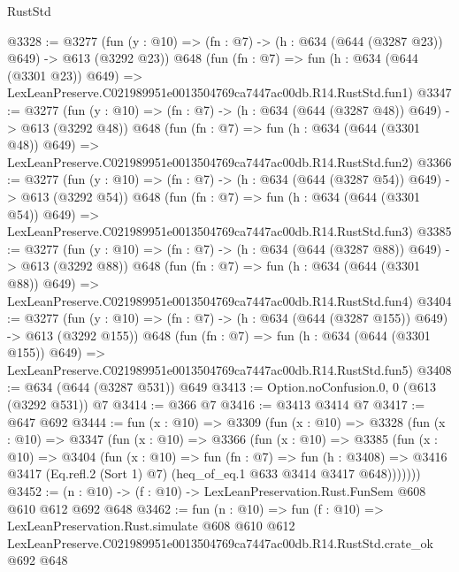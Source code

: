 \begin{lexlean}{RustStd}
\begin{coremodule}
@3328 := @3277
    (fun (y : @10) => (fn : @7) -> (h : @634 (@644 (@3287 @23)) @649) -> @613 (@3292 @23))
    @648
    (fun (fn : @7) =>
    fun (h : @634 (@644 (@3301 @23)) @649) =>
    LexLeanPreserve.C021989951e0013504769ca7447ac00db.R14.RustStd.fun1)
@3347 := @3277
    (fun (y : @10) => (fn : @7) -> (h : @634 (@644 (@3287 @48)) @649) -> @613 (@3292 @48))
    @648
    (fun (fn : @7) =>
    fun (h : @634 (@644 (@3301 @48)) @649) =>
    LexLeanPreserve.C021989951e0013504769ca7447ac00db.R14.RustStd.fun2)
@3366 := @3277
    (fun (y : @10) => (fn : @7) -> (h : @634 (@644 (@3287 @54)) @649) -> @613 (@3292 @54))
    @648
    (fun (fn : @7) =>
    fun (h : @634 (@644 (@3301 @54)) @649) =>
    LexLeanPreserve.C021989951e0013504769ca7447ac00db.R14.RustStd.fun3)
@3385 := @3277
    (fun (y : @10) => (fn : @7) -> (h : @634 (@644 (@3287 @88)) @649) -> @613 (@3292 @88))
    @648
    (fun (fn : @7) =>
    fun (h : @634 (@644 (@3301 @88)) @649) =>
    LexLeanPreserve.C021989951e0013504769ca7447ac00db.R14.RustStd.fun4)
@3404 := @3277
    (fun (y : @10) => (fn : @7) -> (h : @634 (@644 (@3287 @155)) @649) -> @613 (@3292 @155))
    @648
    (fun (fn : @7) =>
    fun (h : @634 (@644 (@3301 @155)) @649) =>
    LexLeanPreserve.C021989951e0013504769ca7447ac00db.R14.RustStd.fun5)
@3408 := @634 (@644 (@3287 @531)) @649
@3413 := Option.noConfusion.{0, 0} (@613 (@3292 @531)) @7
@3414 := @366 @7
@3416 := @3413 @3414 @7
@3417 := @647 @692
@3444 := fun (x : @10) =>
  @3309
    (fun (x : @10) =>
    @3328
      (fun (x : @10) =>
      @3347
        (fun (x : @10) =>
        @3366
          (fun (x : @10) =>
          @3385
            (fun (x : @10) =>
            @3404
              (fun (x : @10) =>
              fun (fn : @7) =>
              fun (h : @3408) =>
              @3416 @3417 (Eq.refl.{2} (Sort 1) @7) (heq_of_eq.{1} @633 @3414 @3417 @648)))))))
@3452 := (n : @10) -> (f : @10) -> LexLeanPreservation.Rust.FunSem @608 @610 @612 @692 @648
@3462 := fun (n : @10) =>
  fun (f : @10) =>
  LexLeanPreservation.Rust.simulate
    @608
    @610
    @612
    LexLeanPreserve.C021989951e0013504769ca7447ac00db.R14.RustStd.crate_ok
    @692
    @648
\end{coremodule}
\end{lexlean}
